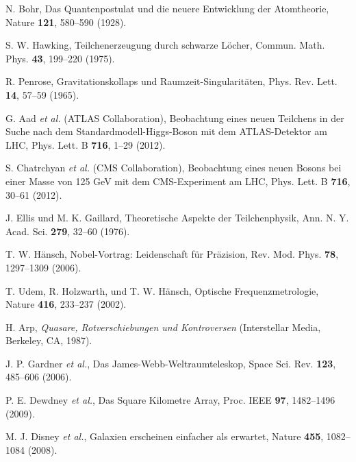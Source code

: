 \documentclass[twocolumn,aps,prl]{revtex4-2}
\begin{document}
{{{{{{{{{{{{{{{{\begin{thebibliography}{99}
																				 N. Bohr, Das Quantenpostulat und die neuere Entwicklung der Atomtheorie, Nature \textbf{121}, 580--590 (1928).
																				
																				 S. W. Hawking, Teilchenerzeugung durch schwarze Löcher, Commun. Math. Phys. \textbf{43}, 199--220 (1975).
																				
																				 R. Penrose, Gravitationskollaps und Raumzeit-Singularitäten, Phys. Rev. Lett. \textbf{14}, 57--59 (1965).
																				
																				 G. Aad \textit{et al.} (ATLAS Collaboration), Beobachtung eines neuen Teilchens in der Suche nach dem Standardmodell-Higgs-Boson mit dem ATLAS-Detektor am LHC, Phys. Lett. B \textbf{716}, 1--29 (2012).
																				
																				 S. Chatrchyan \textit{et al.} (CMS Collaboration), Beobachtung eines neuen Bosons bei einer Masse von 125 GeV mit dem CMS-Experiment am LHC, Phys. Lett. B \textbf{716}, 30--61 (2012).
																				
																				 J. Ellis und M. K. Gaillard, Theoretische Aspekte der Teilchenphysik, Ann. N. Y. Acad. Sci. \textbf{279}, 32--60 (1976).
																				
																				 T. W. Hänsch, Nobel-Vortrag: Leidenschaft für Präzision, Rev. Mod. Phys. \textbf{78}, 1297--1309 (2006).
																				
																				 T. Udem, R. Holzwarth, und T. W. Hänsch, Optische Frequenzmetrologie, Nature \textbf{416}, 233--237 (2002).
																				
																				 H. Arp, \textit{Quasare, Rotverschiebungen und Kontroversen} (Interstellar Media, Berkeley, CA, 1987).
																				
																				 J. P. Gardner \textit{et al.}, Das James-Webb-Weltraumteleskop, Space Sci. Rev. \textbf{123}, 485--606 (2006).
																				
																				 P. E. Dewdney \textit{et al.}, Das Square Kilometre Array, Proc. IEEE \textbf{97}, 1482--1496 (2009).
																				
																				 M. J. Disney \textit{et al.}, Galaxien erscheinen einfacher als erwartet, Nature \textbf{455}, 1082--1084 (2008).
																				

\end{thebibliography}}}}}}}}}}}}}}}}}
\end{document}
